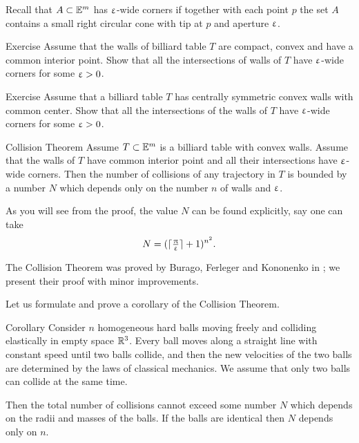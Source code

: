 Recall that $A\subset \EE^m$ has $\upvarepsilon$-wide corners
if together with each point $p$
the set $A$ contains a small right circular cone
with tip at $p$ and aperture $\upvarepsilon$.


\begin{thm}{Exercise}\label{ex:compact-walls}
Assume that the walls
of billiard table $T$ 
are compact, convex and have a common  interior point.
Show that all the intersections of  walls of $T$ have $\upvarepsilon$-wide corners for some $\upvarepsilon>0$.
\end{thm}

\begin{thm}{Exercise}\label{ex:centrally-simmetric-walls}
Assume that a billiard table $T$ has
centrally symmetric convex walls with common center.
Show that all the intersections of the walls of $T$  have $\upvarepsilon$-wide corners for some $\upvarepsilon>0$.
\end{thm}

\begin{thm}{Collision Theorem}\label{thm:collision}
Assume $T\subset\EE^m$
is a billiard table with convex walls.
Assume that the walls of $T$ have common interior point 
and all their intersections have $\upvarepsilon$-wide corners.
Then the number of collisions of any trajectory in  $T$  is bounded
by a number $N$ which depends only on the number $n$ of walls and $\upvarepsilon$.
\end{thm}

As you will see from the proof,
the value $N$ can be found explicitly,
say one can take 
\[N=(\lceil\tfrac{\uppi}{\upvarepsilon}\rceil+1)^{n^2}.\]

The Collision Theorem was proved by Burago, Ferleger and Kononenko in \cite{BFK};
we present their proof with minor improvements.

Let us formulate and prove a corollary of the  Collision Theorem.

\begin{thm}{Corollary}\label{cor:balls}
Consider $n$ homogeneous hard balls
moving freely and colliding
elastically in empty space $\mathbb{R}^3$. 
Every ball moves
along a straight line with constant speed until two balls collide, and then
the new velocities of the two balls are determined by the
laws of classical mechanics. 
We assume that only two balls can collide at the same time.

Then the total number of collisions cannot exceed some number $N$ which depends on the radii and masses of the balls.
If the balls are identical then $N$ depends only on $n$.
\end{thm}


